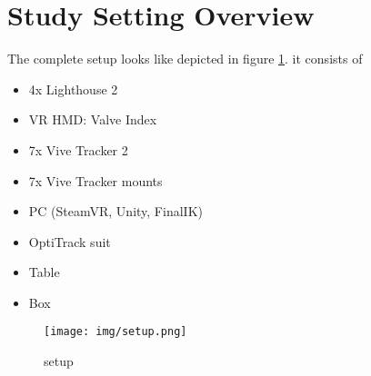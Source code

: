 \section{Study Setting Overview}
The complete setup looks like depicted in figure \ref{fig:setup}. it consists of 

\begin{itemize}
	\item 4x Lighthouse 2
	\item VR HMD: Valve Index
	\item 7x Vive Tracker 2
	\item 7x Vive Tracker mounts
	\item PC (SteamVR, Unity, FinalIK)
	\item OptiTrack suit
	\item Table
	\item Box
\end{itemize}

\begin{figure}
	\centering
	\texttt{[image: img/setup.png]}
	\caption{setup}
	\label{fig:setup}
\end{figure}
